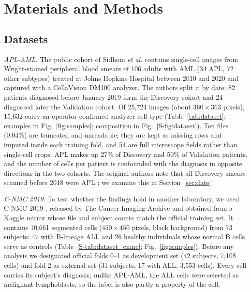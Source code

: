 \documentclass[journal]{IEEEtran}
\begin{document}
\section{Materials and Methods}

\subsection{Datasets}
\emph{APL-AML.} The public cohort of Sidhom \emph{et al.} \cite{sidhom2021apl} contains single-cell images from Wright-stained peripheral blood smears of 106 adults with AML (34 APL, 72 other subtypes) treated at Johns Hopkins Hospital between 2010 and 2020 and captured with a CellaVision DM100 analyzer. The authors split it by date: 82 patients diagnosed before January 2019 form the Discovery cohort and 24 diagnosed later the Validation cohort. Of 25,724 images (about $360\times363$ pixels), 15,632 carry an operator-confirmed analyzer cell type (Table~\ref{tab:dataset}; examples in Fig.~\ref{fig:samples}; composition in Fig.~\ref{S-fig:dataset}). Ten files (0.04\%) are truncated and unreadable; they are kept as missing rows and imputed inside each training fold, and 54 are full microscope fields rather than single-cell crops. APL makes up 27\% of Discovery and 50\% of Validation patients, and the number of cells per patient is confounded with the diagnosis in opposite directions in the two cohorts. The original authors note that all Discovery smears scanned before 2018 were APL \cite{sidhom2021apl}; we examine this in Section~\ref{sec:date}.

\emph{C-NMC 2019.} To test whether the findings hold in another laboratory, we used C-NMC 2019 \cite{gupta2022cnmc}, released by The Cancer Imaging Archive \cite{mourya2019cnmcdata} and obtained from a Kaggle mirror whose file and subject counts match the official training set. It contains 10,661 segmented cells ($450\times450$ pixels, black background) from 73 subjects: 47 with B-lineage ALL and 26 healthy individuals whose normal B cells serve as controls (Table~\ref{S-tab:dataset_cnmc}; Fig.~\ref{fig:samples}). Before any analysis we designated official folds 0--1 as development set (42 subjects, 7,108 cells) and fold 2 as external set (31 subjects, 17 with ALL, 3,553 cells). Every cell carries its subject's diagnosis; unlike APL-AML, the ALL cells were selected as malignant lymphoblasts, so the label is also partly a property of the cell.
\end{document}
